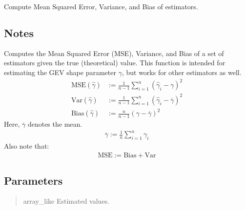 \documentclass[a4paper,11pt,openany,english]{sphinxmanual}
\begin{document}
\begin{fulllineitems}
\label{\detokenize{api_misc:xtremes.miscellaneous.mse}}
\pysigstartsignatures
{}
\pysigstopsignatures
\sphinxAtStartPar
Compute Mean Squared Error, Variance, and Bias of estimators.


\subsection{Notes}
\label{\detokenize{api_misc:id5}}
\sphinxAtStartPar
Computes the Mean Squared Error (MSE), Variance, and Bias of a set of estimators
given the true (theoretical) value. This function is intended for estimating the GEV
shape parameter \(\gamma\), but works for other estimators as well.
\begin{equation*}
\begin{split}\mathrm{MSE}(\hat\gamma) &:= \frac{1}{n-1}\sum_{i=1}^n \left(\hat\gamma_i-\gamma\right)^2 \\
\mathrm{Var}(\hat\gamma) &:= \frac{1}{n-1}\sum_{i=1}^n \left(\hat\gamma_i-\overline\gamma\right)^2 \\
\mathrm{Bias}(\hat\gamma) &:= \frac{n}{n-1} \left(\gamma-\overline\gamma\right)^2\end{split}
\end{equation*}
\sphinxAtStartPar
Here, \(\overline\gamma\) denotes the mean.
\begin{equation*}
\begin{split}\overline\gamma := \frac{1}{n}\sum_{i=1}^n \gamma_i\end{split}
\end{equation*}
\sphinxAtStartPar
Also note that:
\begin{equation*}
\begin{split}\mathrm{MSE} := \mathrm{Bias} + \mathrm{Var}\end{split}
\end{equation*}

\subsection{Parameters}
\label{\detokenize{api_misc:id6}}\begin{quote}\begin{description}
\sphinxAtStartPar
array\_like
Estimated values.


\end{description}
\end{quote}
\end{fulllineitems}
\end{document}
